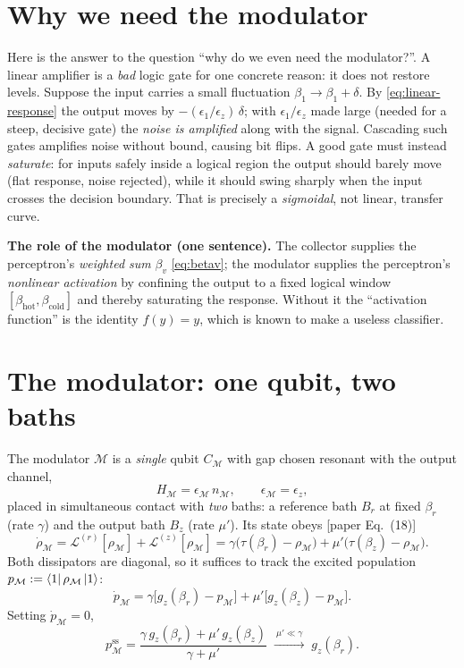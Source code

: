 \documentclass[11pt,a4paper]{article}
\newcommand{\calL}{\mathcal{L}}
\newcommand{\calM}{\mathcal{M}}
\newcommand{\gz}{g_z}
\theoremstyle{definition}
\theoremstyle{remark}
\begin{document}
\section{Why we need the modulator}
\label{sec:why-modulator}
Here is the answer to the question ``why do we even need the
modulator?''. A linear amplifier is a \emph{bad} logic gate for one
concrete reason: it does not restore levels. Suppose the input carries a
small fluctuation $\beta_1\to\beta_1+\delta$. By
\eqref{eq:linear-response} the output moves by
$-(\epsilon_1/\epsilon_z)\,\delta$; with $\epsilon_1/\epsilon_z$ made
large (needed for a steep, decisive gate) the \emph{noise is amplified}
along with the signal. Cascading such gates amplifies noise without
bound, causing bit flips. A good gate must instead \emph{saturate}: for
inputs safely inside a logical region the output should barely move
(flat response, noise rejected), while it should swing sharply when the
input crosses the decision boundary. That is precisely a
\emph{sigmoidal}, not linear, transfer curve.

\begin{keybox}
\textbf{The role of the modulator (one sentence).} The collector
supplies the perceptron's \emph{weighted sum} $\beta_v$
\eqref{eq:betav}; the modulator supplies the perceptron's \emph{nonlinear
activation} by confining the output to a fixed logical window
$[\beta_{\mathrm{hot}},\beta_{\mathrm{cold}}]$ and thereby saturating the
response. Without it the ``activation function'' is the identity
$f(y)=y$, which is known to make a useless classifier.
\end{keybox}

\section{The modulator: one qubit, two baths}
\label{sec:modulator}
The modulator $\calM$ is a \emph{single} qubit $C_\calM$ with gap chosen
resonant with the output channel,
\begin{equation}
H_\calM = \epsilon_\calM\, n_\calM ,\qquad \epsilon_\calM = \epsilon_z ,
\end{equation}
placed in simultaneous contact with \emph{two} baths: a reference bath
$B_r$ at fixed $\beta_r$ (rate $\gamma$) and the output bath $B_z$ (rate
$\mu'$). Its state obeys [paper Eq.~(18)]
\begin{equation}
\dot\rho_\calM = \calL^{(r)}[\rho_\calM] + \calL^{(z)}[\rho_\calM]
= \gamma\big(\tau(\beta_r)-\rho_\calM\big)
+ \mu'\big(\tau(\beta_z)-\rho_\calM\big).
\label{eq:mod-me}
\end{equation}
Both dissipators are diagonal, so it suffices to track the excited
population $p_\calM:=\bra{1}\rho_\calM\ket{1}$:
\begin{equation}
\dot p_\calM = \gamma\big[\gz(\beta_r)-p_\calM\big]
+ \mu'\big[\gz(\beta_z)-p_\calM\big].
\label{eq:mod-pop}
\end{equation}
Setting $\dot p_\calM=0$,
\begin{equation}
p_\calM^{\mathrm{ss}}
= \frac{\gamma\,\gz(\beta_r)+\mu'\,\gz(\beta_z)}{\gamma+\mu'}
\;\xrightarrow{\ \mu'\ll\gamma\ }\; \gz(\beta_r).
\label{eq:mod-ss}
\end{equation}
\end{document}
